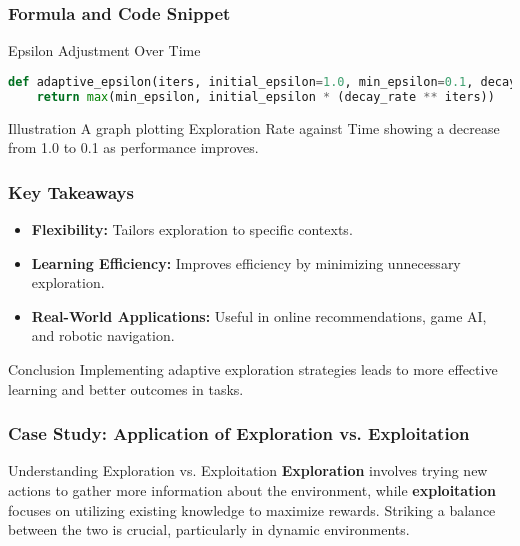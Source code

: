 \documentclass[aspectratio=169]{beamer}
\begin{document}
\begin{frame}[fragile]
    \frametitle{Formula and Code Snippet}
    \begin{block}{Epsilon Adjustment Over Time}
        \begin{lstlisting}[language=Python]
def adaptive_epsilon(iters, initial_epsilon=1.0, min_epsilon=0.1, decay_rate=0.99):
    return max(min_epsilon, initial_epsilon * (decay_rate ** iters))
        \end{lstlisting}
    \end{block}
    
    \begin{block}{Illustration}
        A graph plotting Exploration Rate against Time showing a decrease from 1.0 to 0.1 as performance improves.
    \end{block}
\end{frame}

\begin{frame}[fragile]
    \frametitle{Key Takeaways}
    \begin{itemize}
        \item \textbf{Flexibility:} Tailors exploration to specific contexts.
        \item \textbf{Learning Efficiency:} Improves efficiency by minimizing unnecessary exploration.
        \item \textbf{Real-World Applications:} Useful in online recommendations, game AI, and robotic navigation.
    \end{itemize}
    
    \begin{block}{Conclusion}
        Implementing adaptive exploration strategies leads to more effective learning and better outcomes in tasks.
    \end{block}
\end{frame}

\begin{frame}[fragile]
  \frametitle{Case Study: Application of Exploration vs. Exploitation}
  \begin{block}{Understanding Exploration vs. Exploitation}
    \textbf{Exploration} involves trying new actions to gather more information about the environment, while \textbf{exploitation} focuses on utilizing existing knowledge to maximize rewards. Striking a balance between the two is crucial, particularly in dynamic environments.
  \end{block}
\end{frame}
\end{document}
